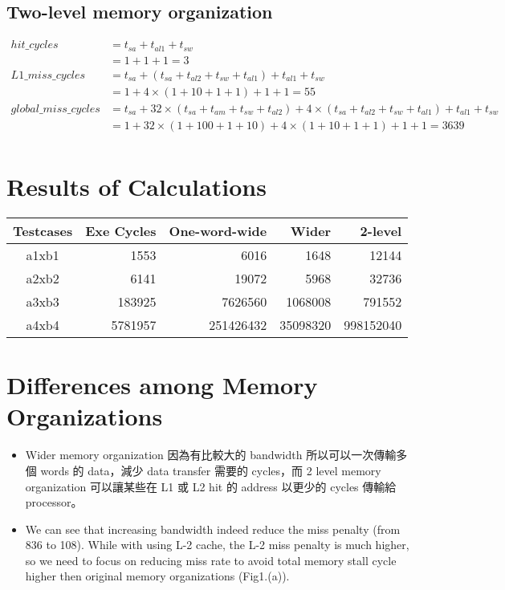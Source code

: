 \documentclass[12pt, a4paper]{article}
\begin{document}
\begin{CJK*}{UTF8}{bsmi}
        \subsection{Two-level memory organization}
            $
            \begin{aligned}
            hit\_cycles         & = t_{sa} + t_{al1} + t_{sw} \\
                               & = 1 + 1 + 1 = 3 \\
            L1\_miss\_cycles     & = t_{sa} + (t_{sa} + t_{al2} + t_{sw} + t_{al1}) + t_{al1} + t_{sw} \\
                               & = 1 + 4 \times (1 + 10 + 1 + 1) + 1 + 1 = 55 \\
            global\_miss\_cycles & = t_{sa} + 32 \times (t_{sa} + t_{am} + t_{sw} + t_{al2}) + 4 \times (t_{sa} + t_{al2} + t_{sw} + t_{al1}) + t_{al1} + t_{sw} \\
                               & = 1 + 32 \times (1 + 100 + 1 + 10) + 4 \times (1 + 10 + 1 + 1) + 1 + 1 = 3639 \\
            \end{aligned}
            $
    \newpage
    \section{Results of Calculations}
        \begin{center}
            \begin{tabular}{crrrr}
            \hline
                Testcases & Exe Cycles & One-word-wide & Wider & 2-level \\
            \hline
                a1xb1 & 1553    & 6016      & 1648     & 12144 \\
                a2xb2 & 6141    & 19072     & 5968     & 32736 \\
                a3xb3 & 183925  & 7626560   & 1068008  & 791552 \\
                a4xb4 & 5781957 & 251426432 & 35098320 & 998152040 \\
            \hline
            \end{tabular}
        \end{center}
    \section{Differences among Memory Organizations}
        \begin{itemize}
            \item Wider memory organization 因為有比較大的 bandwidth 所以可以一次傳輸多個 words 的 data，減少 data transfer 需要的 cycles，而 2 level memory organization 可以讓某些在 L1 或 L2 hit 的 address 以更少的 cycles 傳輸給 processor。
            \item We can see that increasing bandwidth indeed reduce the miss penalty (from 836 to 108). While with using L-2 cache, the L-2 miss penalty is much higher, so we need to focus on reducing miss rate to avoid total memory stall cycle higher then original memory organizations (Fig1.(a)).
        \end{itemize}



\end{CJK*}
\end{document}
